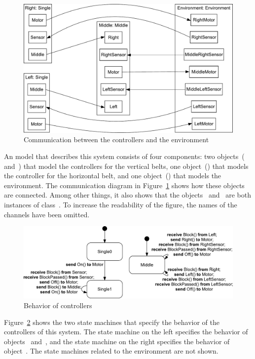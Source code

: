 \begin{figure}[hbt]
  \centering
  \includegraphics[scale=0.45]{slco/figs/ConveyorExampleCommunication}
  \caption{Communication between the controllers and the environment}
  \label{fig:slco:ConveyorComm}
\end{figure}

An \SLCO model that describes this system consists of four components: two objects~( and~) that model the controllers for the vertical belts, one object~() that models the controller for the horizontal belt, and one object~() that models the environment.
The communication diagram in Figure~\ref{fig:slco:ConveyorComm} shows how these objects are connected.
Among other things, it also shows that the objects~ and~ are both instances of class~.
To increase the readability of the figure, the names of the channels have been omitted.

\begin{figure}[hbt]
  \centering
  \includegraphics[scale=0.45]{slco/figs/ConveyorExampleSMS}
  \caption{Behavior of controllers}
  \label{fig:slco:ConveyorSMS}
\end{figure}

Figure~\ref{fig:slco:ConveyorSMS} shows the two state machines that specify the behavior of the controllers of this system.
The state machine on the left specifies the behavior of objects~ and~, and the state machine on the right specifies the behavior of object~.
The state machines related to the environment are not shown.

